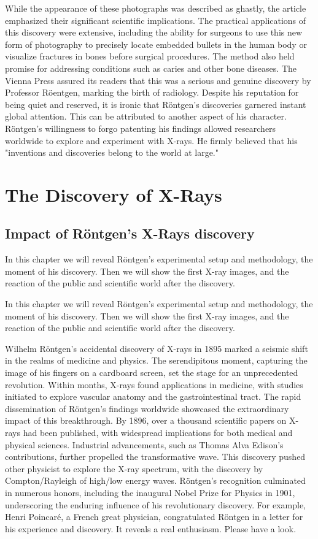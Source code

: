\documentclass[a4paper,12pt]{report}
\begin{document}
While the appearance of these photographs was described as ghastly, the article emphasized their
significant scientific implications. The practical applications of this discovery were extensive,
including the ability for surgeons to use this new form of photography to precisely locate
embedded bullets in the human body or visualize fractures in bones before surgical procedures.
The method also held promise for addressing conditions such as caries and other bone diseases.
The Vienna Press assured its readers that this was a serious and genuine discovery by Professor
Röentgen, marking the birth of radiology.
Despite his reputation for being quiet and reserved, it is ironic that Röntgen's discoveries
garnered instant global attention. This can be attributed to another aspect of his character.
Röntgen's willingness to forgo patenting his findings allowed researchers worldwide to explore
and experiment with X-rays. He firmly believed that his "inventions and discoveries belong to the
world at large."

\chapter{The Discovery of X-Rays}
\section{Impact of Röntgen's X-Rays discovery}
In this chapter we will reveal Röntgen's experimental setup and methodology, the moment of his discovery. Then we will show the first X-ray images, and the reaction of the public and scientific world after the discovery.

In this chapter we will reveal Röntgen's experimental setup and methodology, the
moment of his discovery. Then we will show the first X-ray images, and the reaction of
the public and scientific world after the discovery.

Wilhelm Röntgen's accidental discovery of X-rays in 1895 marked a seismic shift in the
realms of medicine and physics. The serendipitous moment, capturing the image of his fingers
on a cardboard screen, set the stage for an unprecedented revolution. Within months, X-rays
found applications in medicine, with studies initiated to explore vascular anatomy and the
gastrointestinal tract. The rapid dissemination of Röntgen's findings worldwide showcased the
extraordinary impact of this breakthrough. By 1896, over a thousand scientific papers on X-
rays had been published, with widespread implications for both medical and physical
sciences. Industrial advancements, such as Thomas Alva Edison's contributions, further
propelled the transformative wave. This discovery pushed other physicist to explore the X-ray
spectrum, with the discovery by Compton/Rayleigh of high/low energy waves. Röntgen's
recognition culminated in numerous honors, including the inaugural Nobel Prize for Physics
in 1901, underscoring the enduring influence of his revolutionary discovery.
\newpage
For example, Henri Poincaré, a French great physician, congratulated Röntgen in a letter  for his experience and discovery. It reveals a real enthusiasm. Please have a look.
\end{document}
